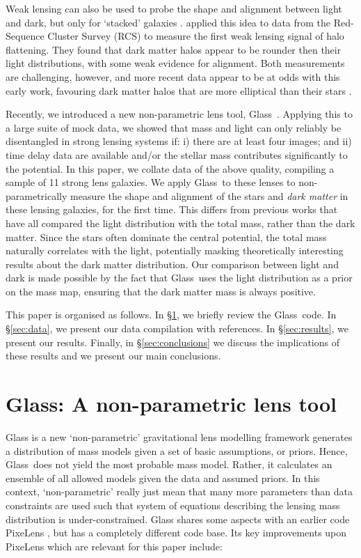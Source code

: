 \documentclass[useAMS,usenatbib]{mn2e}
\def\Glass{{\sc Glass}}
\def\PixeLens{{\sc PixeLens}}
\begin{document}
Weak lensing can also be used to probe the shape and alignment between light and dark, but only for `stacked' galaxies \citep{2000astro.ph..6281B,2000ApJ...538L.113N}. \citet{2004ApJ...606...67H} applied this idea to data from the Red-Sequence Cluster Survey (RCS) to measure the first weak lensing signal of halo flattening. They found that dark matter halos appear to be rounder then their light distributions, with some weak evidence for alignment. Both measurements are challenging, however, and more recent data appear to be at odds with this early work, favouring dark matter halos that are more elliptical than their stars \citep{2006MNRAS.370.1008M,2007ApJ...669...21P,2012A&A...545A..71V}.

Recently, we introduced a new non-parametric lens tool, \Glass\ \citep{2014arXiv1401.7990C}. Applying this to a large suite of mock data, we showed that mass and light can only reliably be disentangled in strong lensing systems if: i) there are at least four images; and ii) time delay data are available and/or the stellar mass contributes significantly to the potential. In this paper, we collate data of the above quality, compiling a sample of 11 strong lens galaxies. We apply \Glass\ to these lenses to non-parametrically measure the shape and alignment of the stars and {\it dark matter}  in these lensing galaxies, for the first time. This differs from previous works that have all compared the light distribution with the total mass, rather than the dark matter. Since the stars often dominate the central potential, the total mass naturally correlates with the light, potentially masking theoretically interesting results about the dark matter distribution. Our comparison between light and dark is made possible by the fact that \Glass\ uses the light distribution as a prior on the mass map, ensuring that the dark matter mass is always positive.

This paper is organised as follows. In \S\ref{sec:glass}, we briefly review the \Glass\ code. In \S\ref{sec:data}, we present our data compilation with references. In \S\ref{sec:results}, we present our results. Finally, in \S\ref{sec:conclusions} we discuss the implications of these results and we present our main conclusions.

\section{\Glass: A non-parametric lens tool}\label{sec:glass}

\Glass{} is a new `non-parametric' gravitational lens modelling framework
\citep{2014arXiv1401.7990C} generates a distribution of
mass models given a set of basic assumptions, or priors. Hence, \Glass\ does not yield the most probable mass model. Rather, it calculates an ensemble of all allowed models given the data and assumed priors. In this context,
`non-parametric' really just mean that many more parameters than data constraints are used
such that system of equations describing the lensing mass distribution is
under-constrained. \Glass{} shares some aspects with an earlier code
\PixeLens{} \citep{2004AJ....127.2604S,2008ApJ...679...17C}, but has a completely
different code base. Its key improvements upon \PixeLens{} which are relevant
for this paper include:
\end{document}
